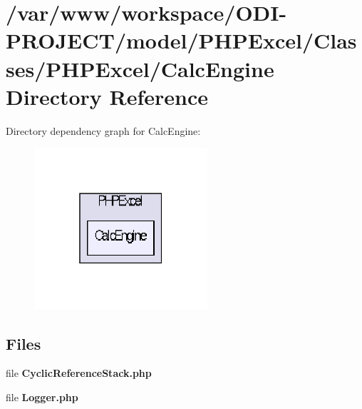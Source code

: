 \section{/var/www/workspace/\+O\+D\+I-\/\+P\+R\+O\+J\+E\+C\+T/model/\+P\+H\+P\+Excel/\+Classes/\+P\+H\+P\+Excel/\+Calc\+Engine Directory Reference}
\label{dir_9176717f4202b607b27d53ca3611077a}
Directory dependency graph for Calc\+Engine\+:\nopagebreak
\begin{figure}[H]
\begin{center}
\leavevmode
\includegraphics[width=182pt]{dir_9176717f4202b607b27d53ca3611077a_dep}
\end{center}
\end{figure}
\subsection*{Files}
\begin{DoxyCompactItemize}
\item 
file {\bfseries Cyclic\+Reference\+Stack.\+php}
\item 
file {\bfseries Logger.\+php}
\end{DoxyCompactItemize}

